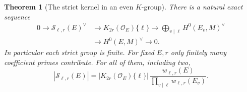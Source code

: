 \documentclass[a4paper,11pt]{article}
\newtheorem{theorem}[proposition]{Theorem}
\theoremstyle{definition}
\theoremstyle{remark}
\numberwithin{equation}{section}
\newcommand{\Sel}{\mathcal S}
\newcommand{\OO}{\mathcal O}
\begin{document}
\begin{theorem}[The strict kernel in an even \(K\)-group]\label{thm:wild98}
There is a natural exact sequence
\begin{equation}
 \begin{split}
 0\longrightarrow \Sel_{\ell,r}(E)^\vee
 &\longrightarrow K_{2r}(\OO_E)\{\ell\}
 \longrightarrow \bigoplus_{v\mid\ell}H^0(E_v,M)^\vee\\
 &\longrightarrow H^0(E,M)^\vee\longrightarrow 0 .
 \end{split}                                                 \label{eq:wild98}
\end{equation}
In particular each strict group is finite. For fixed \(E,r\)
only finitely many coefficient primes contribute. For all of them,
including two,
\begin{equation}
 |\Sel_{\ell,r}(E)| =
   |K_{2r}(\OO_E)\{\ell\}|\,
       \frac{w_{\ell,r}(E)}{\prod_{v\mid\ell}w_{\ell,r}(E_v)} .
 \label{eq:orders98}
\end{equation}
\end{theorem}
\end{document}
